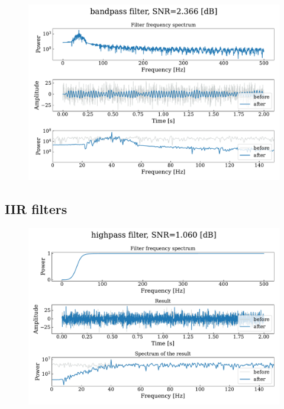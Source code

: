 \documentclass[13pt,a4paper]{article}
\begin{document}
\begin{figure}[ht!]
    \centering
    \includegraphics[width=0.9\linewidth]{fir.bandpass.pdf}
\end{figure}
\pagebreak


\subsection{IIR filters}

\begin{figure}[ht!]
    \centering
    \includegraphics[width=0.9\linewidth]{iir.highpass.pdf}
\end{figure}
\end{document}
